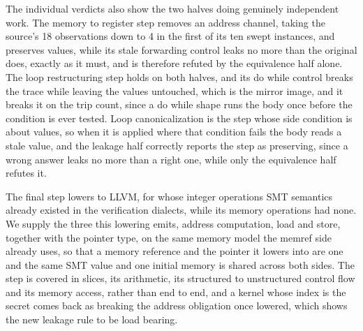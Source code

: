 The individual verdicts also show the two halves doing genuinely independent work.
The memory to register step removes an address channel, taking the source's 18 observations down to 4 in the first of its ten swept instances, and preserves values, while its stale forwarding control leaks no more than the original does, exactly as it must, and is therefore refuted by the equivalence half alone.
The loop restructuring step holds on both halves, and its do while control breaks the trace while leaving the values untouched, which is the mirror image, and it breaks it on the trip count, since a do while shape runs the body once before the condition is ever tested.
Loop canonicalization is the step whose side condition is about values, so when it is applied where that condition fails the body reads a stale value, and the leakage half correctly reports the step as preserving, since a wrong answer leaks no more than a right one, while only the equivalence half refutes it.

The final step lowers to LLVM, for whose integer operations SMT semantics already existed in the verification dialects, while its memory operations had none.
We supply the three this lowering emits, address computation, load and store, together with the pointer type, on the same memory model the memref side already uses, so that a memory reference and the pointer it lowers into are one and the same SMT value and one initial memory is shared across both sides.
The step is covered in slices, its arithmetic, its structured to unstructured control flow and its memory access, rather than end to end, and a kernel whose index is the secret comes back as breaking the address obligation once lowered, which shows the new leakage rule to be load bearing.
